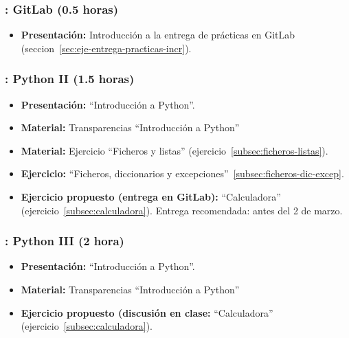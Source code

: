 \documentclass[a4paper,12pt]{article}
\begin{document}
\subsubsection{\martesC: GitLab (0.5 horas)}
\label{cal:martesC}

\begin{itemize}
\item \textbf{Presentación:} Introducción a la entrega de prácticas en GitLab (seccion~\ref{sec:eje-entrega-practicas-incr}).
\end{itemize}

\subsubsection{\martesC: Python II (1.5 horas)}
\label{cal:martesCb}

\begin{itemize}
\item \textbf{Presentación:} ``Introducción a Python''.
\item \textbf{Material:} Transparencias ``Introducción a Python''
\item \textbf{Material:} Ejercicio ``Ficheros y listas'' (ejercicio~\ref{subsec:ficheros-listas}).
\item \textbf{Ejercicio:} ``Ficheros, diccionarios y excepciones''~\ref{subsec:ficheros-dic-excep}.
\item \textbf{Ejercicio propuesto (entrega en GitLab):} ``Calculadora'' (ejercicio~\ref{subsec:calculadora}).
   Entrega recomendada: antes del 2 de marzo.
\end{itemize}

\subsubsection{\martesD: Python III (2 hora)}
\label{cal:martesD}

\begin{itemize}
\item \textbf{Presentación:} ``Introducción a Python''.
\item \textbf{Material:} Transparencias ``Introducción a Python''

\item \textbf{Ejercicio propuesto (discusión en clase:} ``Calculadora'' (ejercicio~\ref{subsec:calculadora}).

\end{itemize}
\end{document}
